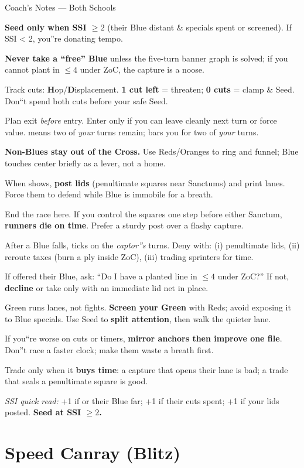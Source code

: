 \documentclass[11pt]{article}
\newcommand{\CC}[1]{\textcolor{blue!60!black}{\scriptsize\ttfamily[CF:#1]}}
\newcommand{\RoC}{\textcolor{teal!60!black}{\scriptsize\ttfamily[Rooted]}}
\newcommand{\RC}{\textcolor{purple!70!black}{\scriptsize\ttfamily[RC]}}
\newenvironment{coachnotes}[1]{%
  \begin{coachbox}{#1}%
    \footnotesize
    \begin{description}[leftmargin=2.8cm,labelsep=0.6em,font=\scshape,
                        itemsep=0.25em,parsep=0pt,topsep=0.2em]
}{%
    \end{description}%
  \end{coachbox}%
}
\newcommand{\CNRow}[2]{\item[#1] #2}
\renewcommand{\RC}[1][]{%
  \textcolor{purple!70!black}{\scriptsize\ttfamily[RC%
  \if\relax\detokenize{#1}\relax\else~#1\fi]}}
\begin{document}
\begin{coachnotes}{Coach's Notes --- Both Schools}
  \CNRow{Seed discipline}{\textbf{Seed only when SSI $\ge 2$} (their Blue distant \& specials spent or screened). If SSI < 2, you''re donating tempo.}
  \CNRow{``Free'' Blue test}{\textbf{Never take a ``free'' Blue} unless the five-turn banner graph is solved; if you cannot plant in $\le 4$ under ZoC, the capture is a noose.}
  \CNRow{Blue specials}{Track cuts: \textbf{H}op/\textbf{D}isplacement. \textbf{1 cut left} = threaten; \textbf{0 cuts} = clamp \& Seed. Don``t spend both cuts before your safe Seed.}
  \CNRow{Cross math}{Plan exit \emph{before} entry. Enter only if you can leave cleanly next turn or force value. \CC{in 1/3} means two of \emph{your} turns remain; \CC{ex 1/2} bars you for two of \emph{your} turns.}
  \CNRow{Ring over Cross}{\textbf{Non-Blues stay out of the Cross.} Use Reds/Oranges to ring and funnel; Blue touches center briefly as a lever, not a home.}
  \CNRow{Rooted punish}{When \RoC{} shows, \textbf{post lids} (penultimate squares near Sanctums) and print lanes. Force them to defend while Blue is immobile for a breath.}
  \CNRow{Penultimate squares}{End the race here. If you control the squares one step before either Sanctum, \textbf{runners die on time}. Prefer a sturdy post over a flashy capture.}
  \CNRow{Reforge denial}{After a Blue falls, \RC{} ticks on the \emph{captor''s} turns. Deny with: (i) penultimate lids, (ii) reroute taxes (burn a ply inside ZoC), (iii) trading sprinters for time.}
  \CNRow{Poison capture}{If offered their Blue, ask: ``Do I have a planted line in $\le 4$ under ZoC?'' If not, \textbf{decline} or take only with an immediate lid net in place.}
  \CNRow{Green usage}{Green runs lanes, not fights. \textbf{Screen your Green} with Reds; avoid exposing it to Blue specials. Use Seed to \textbf{split attention}, then walk the quieter lane.}
  \CNRow{Mirror rule}{If you``re worse on cuts or timers, \textbf{mirror anchors then improve one file}. Don''t race a faster clock; make them waste a breath first.}
  \CNRow{Tempo trades}{Trade only when it \textbf{buys time}: a capture that opens their lane is bad; a trade that seals a penultimate square is good.}
\end{coachnotes}

{\footnotesize\textit{SSI quick read:} +1 if \CC{ex 1/2} or their Blue far; +1 if their cuts spent; +1 if your lids posted. \textbf{Seed at SSI $\ge2$.}}

\clearpage

\section{Speed Canray (Blitz)}
\end{document}
